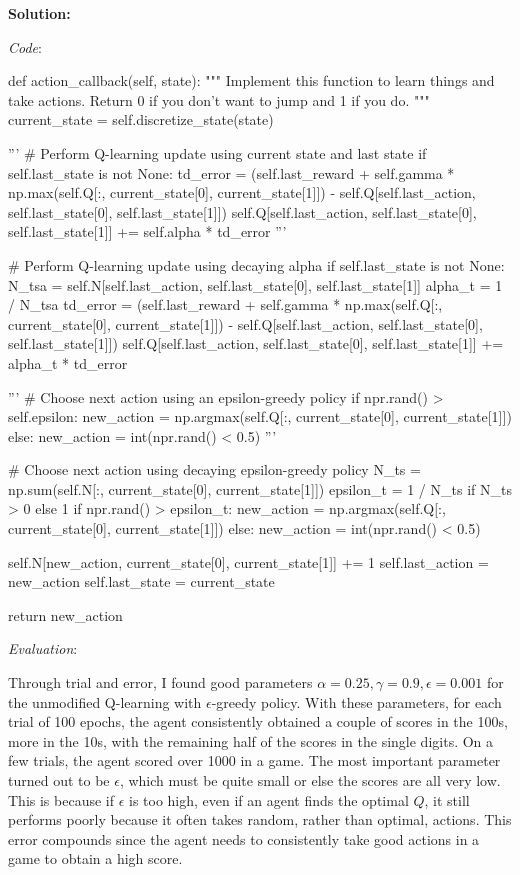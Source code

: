 \documentclass[submit]{harvardml}
\begin{document}
\textbf{Solution:}

\textit{Code}:
\begin{python}
def action_callback(self, state):
	"""
	Implement this function to learn things and take actions.
	Return 0 if you don't want to jump and 1 if you do.
	"""
	current_state = self.discretize_state(state)
	
	'''
	# Perform Q-learning update using current state and last state
	if self.last_state is not None:
		td_error = (self.last_reward + self.gamma *
							np.max(self.Q[:, current_state[0], current_state[1]]) -
							self.Q[self.last_action, self.last_state[0], self.last_state[1]])
		self.Q[self.last_action, self.last_state[0], self.last_state[1]] += self.alpha * td_error
	'''
	
	# Perform Q-learning update using decaying alpha
	if self.last_state is not None:
		N_tsa = self.N[self.last_action, self.last_state[0], self.last_state[1]]
		alpha_t = 1 / N_tsa
		td_error = (self.last_reward + self.gamma *
							np.max(self.Q[:, current_state[0], current_state[1]]) -
							self.Q[self.last_action, self.last_state[0], self.last_state[1]])
		self.Q[self.last_action, self.last_state[0], self.last_state[1]] += alpha_t * td_error

	'''
	# Choose next action using an epsilon-greedy policy
	if npr.rand() > self.epsilon:
		new_action = np.argmax(self.Q[:, current_state[0], current_state[1]])
	else:
		new_action = int(npr.rand() < 0.5)
	'''
	
	# Choose next action using decaying epsilon-greedy policy
	N_ts = np.sum(self.N[:, current_state[0], current_state[1]])
	epsilon_t = 1 / N_ts if N_ts > 0 else 1
	if npr.rand() > epsilon_t:
		new_action = np.argmax(self.Q[:, current_state[0], current_state[1]])
	else:
		new_action = int(npr.rand() < 0.5)
	
	self.N[new_action, current_state[0], current_state[1]] += 1
	self.last_action = new_action
	self.last_state = current_state
	
	return new_action
\end{python}

\textit{Evaluation}:

Through trial and error, I found good parameters $\alpha = 0.25, \gamma = 0.9, \epsilon = 0.001$ for the unmodified Q-learning with $\epsilon$-greedy policy. With these parameters, for each trial of 100 epochs, the agent consistently obtained a couple of scores in the 100s, more in the 10s, with the remaining half of the scores in the single digits. On a few trials, the agent scored over 1000 in a game. The most important parameter turned out to be $\epsilon$, which must be quite small or else the scores are all very low. This is because if $\epsilon$ is too high, even if an agent finds the optimal $Q$, it still performs poorly because it often takes random, rather than optimal, actions. This error compounds since the agent needs to consistently take good actions in a game to obtain a high score.
\end{document}
